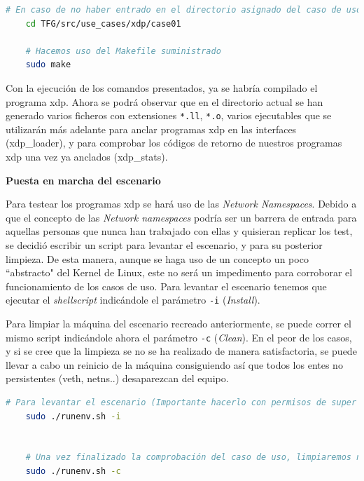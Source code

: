 \begin{lstlisting}[language= bash, style=Consola, caption={Compilación programa XDP - Case01},label=code:case01_xdp_ether_compilacion]
    # En caso de no haber entrado en el directorio asignado del caso de uso
    cd TFG/src/use_cases/xdp/case01
    
    # Hacemos uso del Makefile suministrado 
    sudo make
\end{lstlisting}
\vspace{0.5cm}

Con la ejecución de los comandos presentados, ya se habría compilado el programa \gls{xdp}. Ahora se podrá observar que en el directorio actual se han generado varios ficheros con extensiones \texttt{*.ll}, \texttt{*.o}, varios ejecutables que se utilizarán más adelante para anclar programas \gls{xdp} en las interfaces (xdp\_loader), y para comprobar los códigos de retorno de nuestros programas \gls{xdp} una vez ya anclados (xdp\_stats).

\vspace{0.7cm}
\textbf{Puesta en marcha del escenario}\\
\par
Para testear los programas \gls{xdp} se hará uso de las \textit{Network Namespaces}. Debido a que el concepto de las \textit{Network namespaces} podría ser un barrera de entrada para aquellas personas que nunca han trabajado con ellas y quisieran replicar los test, se decidió escribir un script para levantar el escenario, y para su posterior limpieza. De esta manera, aunque se haga uso de un concepto un poco ``abstracto" del Kernel de Linux, este no será un impedimento para corroborar el funcionamiento de los casos de uso. Para levantar el escenario tenemos que ejecutar el \textit{shellscript} indicándole el parámetro  \texttt{-i} (\textit{Install}).\\
\par

Para limpiar la máquina del escenario recreado anteriormente, se puede correr el mismo script indicándole ahora el parámetro \texttt{-c} (\textit{Clean}). En el peor de los casos, y si se cree que la limpieza se no se ha realizado de manera satisfactoria, se puede llevar a cabo un reinicio de la máquina consiguiendo así que todos los entes no persistentes (\gls{veth}, netns..) desaparezcan del equipo.

\begin{lstlisting}[language= bash, style=Consola, caption={Puesta en marcha del escenario - Case01},label=code:case01_xdp_ether_escenario]
    # Para levantar el escenario (Importante hacerlo con permisos de super usuario)
    sudo ./runenv.sh -i
    
    
    # Una vez finalizado la comprobación del caso de uso, limpiaremos nuestra maquina:
    sudo ./runenv.sh -c
\end{lstlisting}
\vspace{0.5cm}

